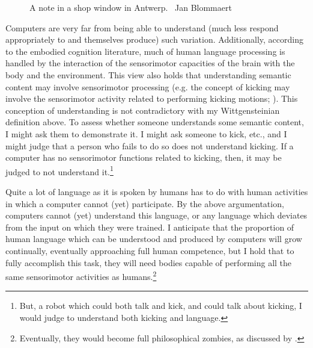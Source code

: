 \documentclass[man,floatsintext,12pt,natbib]{apa6}
\begin{document}
\begin{figure}
	\caption{A note in a shop window in Antwerp. \textcopyright~Jan Blommaert}
\end{figure}

Computers are very far from being able to understand (much less respond
appropriately to and themselves produce) such variation.
Additionally, according to the embodied cognition literature, much of human
language processing is handled by the interaction of the sensorimotor
capacities of the brain with the body and the environment. This view also holds
that understanding semantic content may involve sensorimotor processing (e.g.
the concept of kicking may involve the sensorimotor activity related to
performing kicking motions; \citealp{Rueschemeyer10}).  This conception of
understanding is not contradictory with my Wittgensteinian definition above. To
assess whether someone understands some semantic content, I might ask them to
demonstrate it.  I might ask someone to kick, etc., and I might judge that a
person who fails to do so does not understand kicking. If a computer has no
sensorimotor functions related to kicking, then, it may be judged to not
understand it.\footnote{But, a robot which could both talk and kick, and could
talk about kicking, I would judge to understand both kicking and language.}

Quite a lot of language as it is spoken by humans has to do with human
activities in which a computer cannot (yet) participate. By the above
argumentation, computers cannot (yet) understand this language, or any language
which deviates from the input on which they were trained. I anticipate that the
proportion of human language which can be understood and produced by computers
will grow continually, eventually approaching full human competence, but I hold
that to fully accomplish this task, they will need bodies capable of performing
all the same sensorimotor activities as humans.\footnote{Eventually, they would
become full philosophical zombies, as discussed by \citealp{Chalmers}.}
\end{document}
